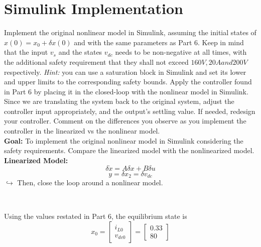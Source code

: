 \documentclass[12pt]{article}
\begin{document}
\section{Simulink Implementation} 
Implement the original nonlinear model in Simulink, assuming the initial states of $x(0) = x_0 + \delta x(0)$ and with the same parameters as Part 6. Keep in mind that the input $v_s$ and the states $v_{dc}$ needs to be non-negative at all times, with the additional safety requirement that they shall not exceed $160V, 20A and 200V$ respectively. \textit{Hint: } you can use a saturation block in Simulink and set its lower and upper limits to the corresponding safety bounds. Apply the controller found in Part 6 by placing it in the closed-loop with the nonlinear model in Simulink. Since we are translating the system back to the original system, adjust the controller input appropriately, and the output's settling value. If needed, redesign your controller. Comment on the differences you observe as you implement the controller in the linearized vs the nonlinear model.\\

\textbf{Goal: }To implement the original nonlinear model in Simulink considering the safety requirements. Compare the linearized model with the nonlinearized model.\\ 

\textbf{Linearized Model: } 
\[\delta \dot{x} = A\delta x + B\delta u\] 
\[y = \delta x_2 = \delta v_{dc}\]
$\hookrightarrow$ Then, close the loop around a nonlinear model.

\

\begin{tcolorbox}[enhanced, frame hidden, colback=white, borderline west={1pt}{0pt}{gray}]
  Using the values restated in Part 6, the equilibrium state is 
  \[
  x_0 = \begin{bmatrix}i_{L0}\\ v_{dc0}\end{bmatrix} = \begin{bmatrix}0.33\\80\end{bmatrix}
  \]
\end{tcolorbox}

\
\end{document}
